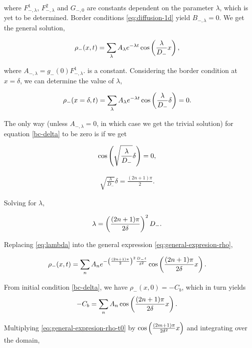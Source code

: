 where $F^1_{-,\lambda}$, $F^2_{-,\lambda}$ and $G_{-,0}$ are constants dependent on the parameter $\lambda$, which is yet to be determined. Border conditions \ref{eq:diffusion-1d} yield $B_{-,\lambda} = 0$. We get the general solution,


\begin{align}
	\rho_-(x,t) = \sum_{\lambda} A_\lambda e^{-\lambda t} \cos\left({\frac{\lambda}{D_-} x}\right),
\end{align}

where $A_{-,\lambda} = g_-(0)F^1_{-,\lambda}$. is a constant. Considering the border condition at $x=\delta$, we can determine the value of $\lambda$,


\begin{align}
	\rho_-(x=\delta,t) = \sum_{\lambda} A_\lambda e^{-\lambda t} \cos\left({\frac{\lambda}{D_-} \delta}\right) = 0.
	\label{bc-delta}
\end{align}

The only way (unless $A_{-,\lambda} = 0$, in which case we get the trivial solution) for equation \ref{bc-delta} to be zero is if we get

\begin{align}\nonumber
	\cos\left({\sqrt{\frac{\lambda}{D_-}} \delta}\right) = 0,
\end{align}


\begin{align}
	\sqrt{\frac{\lambda}{D_-}} \delta = \frac{(2n+1)\pi}{2}.
\end{align}

Solving for $\lambda$,

\begin{align}
	\lambda  = \left({\frac{(2n+1)\pi}{2\delta}}\right)^2 D_-.
	\label{eq:lambda}
\end{align}

Replacing \ref{eq:lambda} into the general expression \ref{eq:general-expresion-rho},

\begin{align}
	\rho_-(x,t) = \sum_{n} A_n e^{-\left({\frac{(2n+1)\pi}{2}}\right)^2\frac{D_- t}{\delta^2}} \cos\left({\frac{(2n+1)\pi}{2\delta} x}\right).
	\label{bc-delta}
\end{align}

From initial condition \ref{bc-delta}, we have $\rho_- (x,0) = -C_b $, which in turn yields
\begin{align}
	-C_b = \sum_{n}A_n\cos\left({\frac{(2n+1)\pi}{2\delta} x}\right).
	\label{eq:general-expresion-rho-t0}
\end{align}

Multiplying \ref{eq:general-expresion-rho-t0} by $\cos\left({\frac{(2m+1)\pi}{2\delta^2} x}\right)$ and integrating over the domain, 



